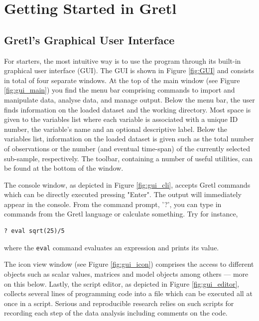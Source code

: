 \documentclass[11pt]{article}
\begin{document}
\section{Getting Started in Gretl}
\subsection{Gretl's Graphical User Interface}
For starters, the most intuitive way is to use the program through its built-in graphical user interface (GUI). The GUI is shown in Figure \ref{fig:GUI} and consists in total of four separate windows. At the top of the main window (see Figure \ref{fig:gui_main}) you find the menu bar comprising commands to import and manipulate data, analyse data, and manage output. Below the menu bar, the user finds information on the loaded dataset and the working directory. Most space is given to the variables list where each variable is associated with a unique ID number, the variable's name and an optional descriptive label. Below the variables list, information on the loaded dataset is given such as the total number of observations or the number (and eventual time-span) of the currently selected sub-sample, respectively. The toolbar, containing a number of useful utilities, can be found at the bottom of the window. 

The console window, as depicted in Figure \ref{fig:gui_cli}, accepts Gretl commands which can be directly executed pressing "Enter". The output will immediately appear in the console. From the command prompt, '?', you can type in commands from the Gretl language or calculate something. Try for instance,
\begin{verbatim}
? eval sqrt(25)/5
\end{verbatim}
where the \texttt{eval} command evaluates an expression and prints its value.

The icon view window (see Figure \ref{fig:gui_icon}) comprises the access to different objects such as scalar values, matrices and model objects among others --- more on this below. Lastly, the script editor, as depicted in Figure \ref{fig:gui_editor}, collects several lines of programming code into a file which can be executed all at once in a script. Serious and reproducible research relies on such scripts for recording each step of the data analysis including comments on the code.
\end{document}
